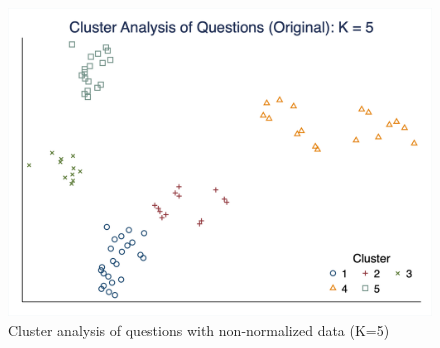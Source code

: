 \documentclass[10pt,leqno]{article}
\begin{document}
\begin{figure}  [h!]
\begin{center}
\caption{Cluster analysis of questions with non-normalized data (K=5)}
\includegraphics[scale=0.25]{CA_QuestionK5_ORI.png}
\end{center}
\end{figure}  
\end{document}
